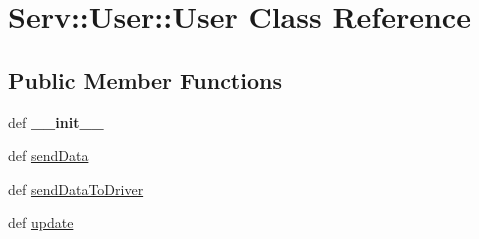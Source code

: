 \hypertarget{class_serv_1_1_user_1_1_user}{
\section{Serv::User::User Class Reference}
\label{class_serv_1_1_user_1_1_user}
}
\subsection*{Public Member Functions}
\begin{CompactItemize}
\item 
\hypertarget{class_serv_1_1_user_1_1_user_e503b7d48b7eb7c8a399f2652a3ff002}{
def \textbf{\_\-\_\-init\_\-\_\-}}
\label{class_serv_1_1_user_1_1_user_e503b7d48b7eb7c8a399f2652a3ff002}

\item 
def \hyperlink{class_serv_1_1_user_1_1_user_2d0441db55283b641079acb8bf67c30a}{sendData}
\item 
def \hyperlink{class_serv_1_1_user_1_1_user_0907f262b618e5b6c05c6e3584e24b44}{sendDataToDriver}
\item 
def \hyperlink{class_serv_1_1_user_1_1_user_90697aec786a688ec3308b3ebdcc83a3}{update}
\end{CompactItemize}

